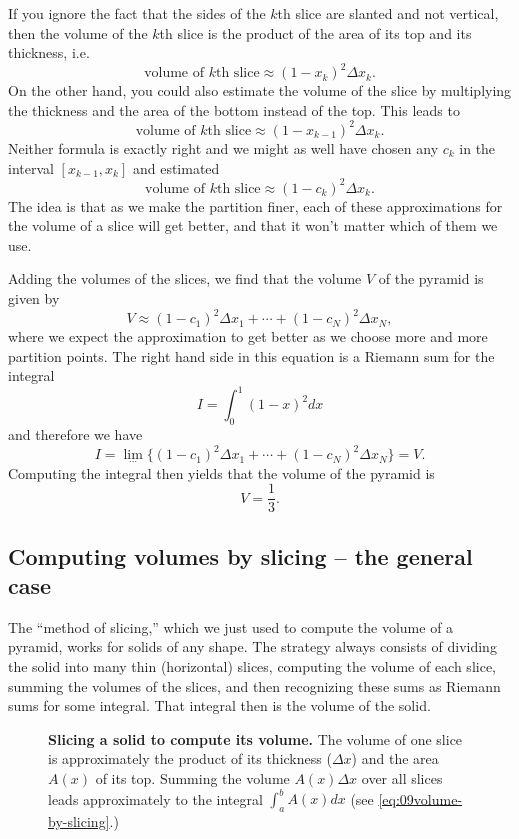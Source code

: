 If you ignore the fact that the sides of the $k$th slice are slanted and not
vertical, then the volume of the $k$th slice is the product of the area of its
top and its thickness, i.e.  \marginpar{\footnotesize\sffamily\itshape%
  }%
\[
\text{volume of $k$th slice} \approx (1-x_k)^2\Delta x_k.
\]
On the other hand, you could also estimate the volume of the slice by
multiplying the thickness and the area of the bottom instead of the top.  This
leads to
\[
\text{volume of $k$th slice} \approx (1-x_{k-1})^2\Delta x_k.
\]
Neither formula is exactly right and we might as well have chosen any $c_k$ in
the interval $[x_{k-1}, x_k]$ and estimated
\[
\text{volume of $k$th slice} \approx (1-c_k)^2\Delta x_k.
\]
The idea is that as we make the partition finer, each of these approximations
for the volume of a slice will get better, and that it won't matter which of
them we use.

Adding the volumes of the slices, we find that the volume $V$ of the pyramid is
given by
\[
V \approx (1-c_1)^2\Delta x_1 + \cdots + (1-c_N)^2\Delta x_N,
\]
where we expect the approximation to get better as we choose more and more
partition points.  The right hand side in this equation is a Riemann sum for the
integral
\[
I = \int_0^1 (1-x)^2dx
\]
and therefore we have
\[
I = \lim_{\cdots} \bigl\{ (1-c_1)^2\Delta x_1 + \cdots + (1-c_N)^2\Delta x_N
\bigr\} =V.
\]
Computing the integral then yields that the volume of the pyramid is
\[
V = \frac13.
\]

\subsection{Computing volumes by slicing -- the general case} %
The ``method of slicing,'' which we just used to compute the volume of a
pyramid, works for solids of any shape.  The strategy always consists of
dividing the solid into many thin (horizontal) slices, computing the volume of
each slice, summing the volumes of the slices, and then recognizing these sums
as Riemann sums for some integral.  That integral then is the volume of the
solid.

\begin{figure}[t]
  \centerline{}
  \caption{\textbf{Slicing a solid to compute its volume.}  The volume of one
    slice is approximately the product of its thickness ($\Delta x$) and the
    area $A(x)$ of its top.  Summing the volume $A(x)\Delta x$ over all slices
    leads approximately to the integral $\int_a^b A(x) dx$ (see
    \eqref{eq:09volume-by-slicing}.)}
  \label{fig:09Xslices}
\end{figure}

